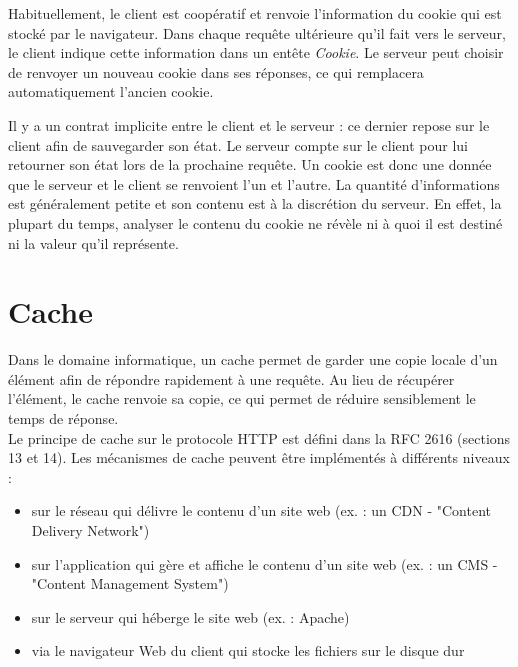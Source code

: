 Habituellement, le client est coopératif et renvoie l'information du cookie qui est stocké par le navigateur. Dans chaque requête ultérieure qu'il fait vers le serveur, le client indique cette information dans un entête \textit{Cookie}. Le serveur peut choisir de renvoyer un nouveau cookie dans ses réponses, ce qui remplacera automatiquement l'ancien cookie.
\newline

Il y a un contrat implicite entre le client et le serveur : ce dernier repose sur le client afin de sauvegarder son état. Le serveur compte sur le client pour lui retourner son état lors de la prochaine requête. Un cookie est donc une donnée que le serveur et le client se renvoient l'un et l'autre. La quantité d'informations est généralement petite et son contenu est à la discrétion du serveur. En effet, la plupart du temps, analyser le contenu du cookie ne révèle ni à quoi il est destiné ni la valeur qu'il représente.


\section{Cache}
Dans le domaine informatique, un cache permet de garder une copie locale d'un élément afin de répondre rapidement à une requête. Au lieu de récupérer l'élément, le cache renvoie sa copie, ce qui permet de réduire sensiblement le temps de réponse.\\
Le principe de cache sur le protocole HTTP est défini dans la RFC 2616 \cite{IETF_RFC2616} (sections 13 et 14). Les mécanismes de cache peuvent être implémentés à différents niveaux :
\begin{itemize}
  \item sur le réseau qui délivre le contenu d'un site web (ex. : un CDN - "Content Delivery Network")
  \item sur l'application qui gère et affiche le contenu d'un site web (ex. : un CMS - "Content Management System")
  \item sur le serveur qui héberge le site web (ex. : Apache)
  \item via le navigateur Web du client qui stocke les fichiers sur le disque dur
  \newline
\end{itemize}

